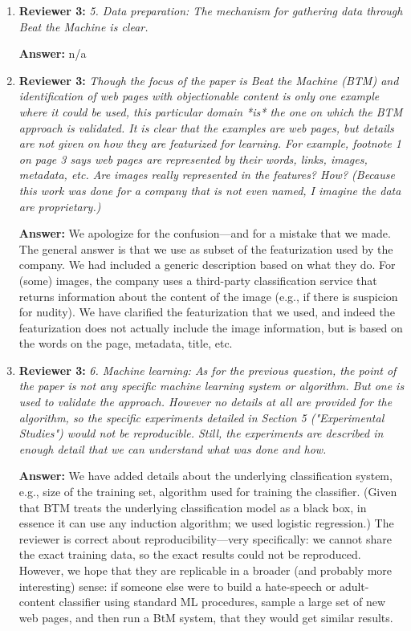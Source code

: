 \documentclass[letterpaper]{article}
\begin{document}
\begin{enumerate}
\item \textbf{Reviewer 3:} \emph{ 5. Data preparation: The mechanism for gathering data through Beat the Machine is clear.}

\textbf{Answer:} n/a

\item \textbf{Reviewer 3:} \emph{ Though the focus of the paper is Beat the Machine (BTM) and identification of web pages with objectionable content is only one example where it could be used, this particular domain *is* the one on which the BTM approach is validated.  It is clear that the examples are web pages, but details are not given on how they are featurized for learning.  For example, footnote 1 on page 3 says web pages are represented by their words, links, images, metadata, etc.  Are images really represented in the features?  How? (Because this work was done for a company that is not even named, I imagine the data are proprietary.)}

\textbf{Answer:} We apologize for the confusion---and for a mistake that we made. The general answer is that we use as subset of the featurization used by the company.  We had included a generic description based on what they do.  For (some) images, the company uses a third-party classification service that returns information about the content of the image (e.g., if there is suspicion for nudity). We have clarified the featurization that we used, and indeed the featurization does not actually include the image information, but is based on the words on the page, metadata, title, etc.  

\item \textbf{Reviewer 3:} \emph{ 6. Machine learning: As for the previous question, the point of the paper is not any specific machine learning system or algorithm.  But one is used to validate the approach.  However no details at all are provided for the algorithm, so the specific experiments detailed in Section 5 ("Experimental Studies") would not be reproducible. Still, the experiments are described in enough detail that we can understand what was done and how.}

\textbf{Answer:} We have added details about the underlying classification system, e.g., size of the training set, algorithm used for training the classifier. (Given that BTM treats the underlying classification model as a black box, in essence it can use any induction algorithm; we used logistic regression.)  The reviewer is correct about reproducibility---very specifically: we cannot share the exact training data, so the exact results could not be reproduced.  However, we hope that they are replicable in a broader (and probably more interesting) sense: if someone else were to build a hate-speech or adult-content classifier using standard ML procedures, sample a large set of new web pages, and then run a BtM system, that they would get similar results.  


\end{enumerate}
\end{document}
